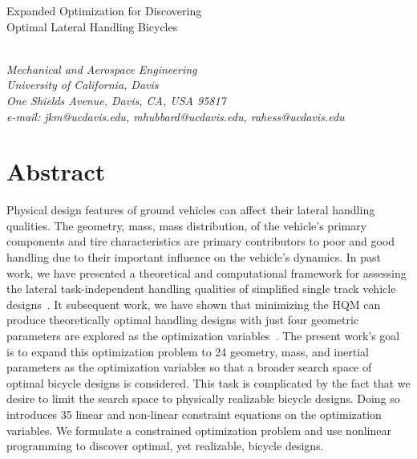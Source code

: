 \documentclass{bmd2019a}
\begin{document}
\begin{flushleft}
{\fontsize{16pt}{20pt}\selectfont%
  Expanded Optimization for Discovering\\}
{\fontsize{16pt}{20pt}\selectfont%
  Optimal Lateral Handling Bicycles}
\end{flushleft}

\begin{flushleft}
  {\\}
  \textit{Mechanical and Aerospace Engineering\\
          University of California, Davis\\
          One Shields Avenue, Davis, CA, USA 95817\\
          e-mail: jkm@ucdavis.edu, mhubbard@ucdavis.edu, rahess@ucdavis.edu}
\end{flushleft}

\section*{Abstract}
%
Physical design features of ground vehicles can affect their lateral handling
qualities. The geometry, mass, mass distribution, of the vehicle's primary
components and tire characteristics are primary contributors to poor and good
handling due to their important influence on the vehicle's dynamics. In past
work, we have presented a theoretical and computational framework for assessing
the lateral task-independent handling qualities of simplified single track
vehicle designs~\cite{Hess2012,Moore2012}. It subsequent work, we have shown
that minimizing the HQM can produce theoretically optimal handling designs with
just four geometric parameters are explored as the optimization
variables~\cite{Moore2016}. The present work's goal is to expand this
optimization problem to 24 geometry, mass, and inertial parameters as the
optimization variables so that a broader search space of optimal bicycle
designs is considered. This task is complicated by the fact that we desire to
limit the search space to physically realizable bicycle designs. Doing so
introduces 35 linear and non-linear constraint equations on the optimization
variables. We formulate a constrained optimization problem and use nonlinear
programming to discover optimal, yet realizable, bicycle designs.
\end{document}

